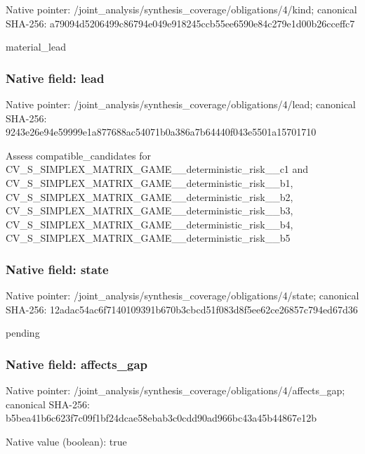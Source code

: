 \documentclass[10pt,a4paper]{article}
\begin{document}
Native pointer: /joint\_analysis/synthesi\allowbreak{}s\_coverage/obligations/4\allowbreak{}/kind; canonical SHA-256: a79094d5206499c86794e049\allowbreak{}e918245ccb55ee6590e84c27\allowbreak{}9e1d00b26cceffc7


material\_lead


\subsubsection{Native field: lead}


Native pointer: /joint\_analysis/synthesi\allowbreak{}s\_coverage/obligations/4\allowbreak{}/lead; canonical SHA-256: 9243e26e94e59999e1a87768\allowbreak{}8ac54071b0a386a7b64440f0\allowbreak{}43e5501a15701710


Assess compatible\_candidates for CV\_S\_SIMPLEX\_MATRIX\_GAME\allowbreak{}\_\_deterministic\_risk\_\_c1 and CV\_S\_SIMPLEX\_MATRIX\_GAME\allowbreak{}\_\_deterministic\_risk\_\_b1\allowbreak{}, CV\_S\_SIMPLEX\_MATRIX\_GAME\allowbreak{}\_\_deterministic\_risk\_\_b2\allowbreak{}, CV\_S\_SIMPLEX\_MATRIX\_GAME\allowbreak{}\_\_deterministic\_risk\_\_b3\allowbreak{}, CV\_S\_SIMPLEX\_MATRIX\_GAME\allowbreak{}\_\_deterministic\_risk\_\_b4\allowbreak{}, CV\_S\_SIMPLEX\_MATRIX\_GAME\allowbreak{}\_\_deterministic\_risk\_\_b5


\subsubsection{Native field: state}


Native pointer: /joint\_analysis/synthesi\allowbreak{}s\_coverage/obligations/4\allowbreak{}/state; canonical SHA-256: 12adac54ac6f7140109391b6\allowbreak{}70b3cbcd51f083d8f5ee62ce\allowbreak{}26857c794ed67d36


pending


\subsubsection{Native field: affects\_gap}


Native pointer: /joint\_analysis/synthesi\allowbreak{}s\_coverage/obligations/4\allowbreak{}/affects\_gap; canonical SHA-256: b5bea41b6c623f7c09f1bf24\allowbreak{}dcae58ebab3c0cdd90ad966b\allowbreak{}c43a45b44867e12b



Native value (boolean): true
\end{document}
